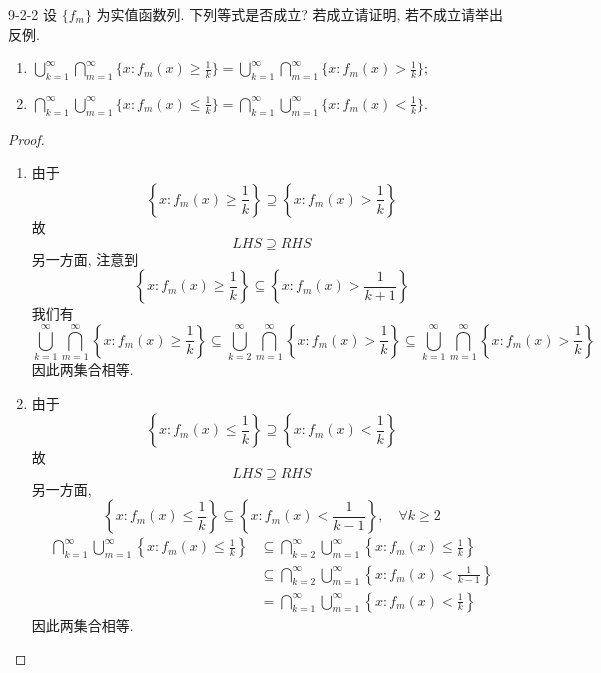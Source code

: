 \documentclass[../main.tex]{subfiles}
\begin{document}
\begin{exercise}{}{9-2-2}
    设 $\{f_m\}$ 为实值函数列. 下列等式是否成立? 若成立请证明, 若不成立请举出反例.
\begin{enumerate}
\item[(i)] $\bigcup_{k=1}^{\infty} \bigcap_{m=1}^{\infty} \{x : f_m(x) \ge \frac{1}{k}\} = \bigcup_{k=1}^{\infty} \bigcap_{m=1}^{\infty} \{x : f_m(x) > \frac{1}{k}\};$
\item[(ii)] $\bigcap_{k=1}^{\infty} \bigcup_{m=1}^{\infty} \{x : f_m(x) \le \frac{1}{k}\} = \bigcap_{k=1}^{\infty} \bigcup_{m=1}^{\infty} \{x : f_m(x) < \frac{1}{k}\}.$
\end{enumerate}
\end{exercise}
\begin{proof}
  \begin{enumerate}
    \item  由于  \[
 \left\{ x:f_{m}\left( x \right)\ge \frac{1 }{k }   \right\}\supseteq  \left\{ x:f_{m}\left( x \right)> \frac{1 }{k }   \right\} 
    \]故 \[
    LHS\supseteq RHS
    \]另一方面, 注意到 \[
    \left\{ x:f_{m}\left( x \right)\ge \frac{1 }{k }   \right\}\subseteq \left\{ x:f_{m}\left( x \right)> \frac{1 }{k+ 1 }   \right\}
    \]我们有 \[
    \bigcup _{k= 1}^{\infty}\bigcap_{m= 1}^{\infty}\left\{ x:f_{m}\left( x \right)\ge \frac{1 }{k }   \right\} \subseteq \bigcup _{k= 2}^{\infty}\bigcap_{m= 1}^{\infty}\left\{ x:f_{m}\left( x \right)> \frac{1 }{k }   \right\}\subseteq \bigcup _{k= 1}^{\infty}\bigcap_{m= 1}^{\infty}\left\{ x:f_{m}\left( x \right)> \frac{1 }{k }   \right\}  
    \]因此两集合相等. 
    \item 由于 \[
    \left\{ x:f_{m}\left( x \right)\le \frac{1 }{k }   \right\}\supseteq \left\{ x:f_{m}\left( x \right)< \frac{1 }{k }   \right\}
    \]故 \[
    LHS\supseteq RHS
    \]另一方面,  \[
    \left\{ x:f_{m}\left( x \right)\le \frac{1 }{k }   \right\}\subseteq \left\{ x:f_{m}\left( x \right)< \frac{1 }{k-1 }   \right\},\quad \forall k\ge 2
    \] \[
   \begin{aligned}
    \bigcap_{k= 1}^{\infty}\bigcup _{m= 1}^{\infty}\left\{ x:f_{m}\left( x \right)\le \frac{1 }{k }   \right\}&\subseteq \bigcap_{k= 2}^{\infty}\bigcup _{m= 1}^{\infty}\left\{ x:f_{m}\left( x \right)\le \frac{1 }{k }   \right\}\\ 
     &\subseteq \bigcap_{k= 2}^{\infty}\bigcup _{m= 1}^{\infty}\left\{ x:f_{m}\left( x \right)< \frac{1 }{k-1 }   \right\} \\ 
      &=  \bigcap_{k= 1}^{\infty}\bigcup _{m= 1}^{\infty}\left\{ x:f_{m}\left( x \right)< \frac{1 }{k }   \right\}    
   \end{aligned}
    \]因此两集合相等.
  \end{enumerate}
  
\end{proof}
\end{document}
